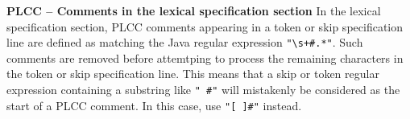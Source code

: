 \begin{minipage}[t]{\sw}
\slidenumber
\LARGE
{\bf PLCC -- Comments in the lexical specification section}\exx
In the lexical specification section,
PLCC comments appearing in a token or skip specification line
are defined as matching the Java regular expression \verb'"\s+#.*"'.
Such comments are removed before attemtping
to process the remaining characters
in the token or skip specification line.
This means that a skip or token regular expression
containing a substring like \verb'" #"'
will mistakenly be considered as the start of a PLCC comment.
In this case, use \verb'"[ ]#"' instead.
\end{minipage}
\clearpage
